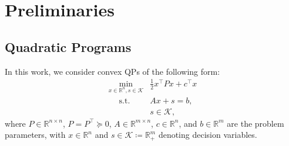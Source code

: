 \documentclass[10pt]{article} %
\begin{document}
\section{Preliminaries}
\label{sec:pre}

\subsection{Quadratic Programs}
In this work, we consider convex QPs of the following form:
\begin{equation}
\label{eq:qcp}
    \begin{array}{ll}
        \underset{x\in\mathbb{R}^n, s\in\mathcal{K}}{\min} & \frac{1}{2} x^{\top} P x + c^{\top} x \\
        \quad \; \text{s.t.} & A x + s = b, \\
                          & s \in \mathcal{K},
    \end{array}
\end{equation}
where $P\in\mathbb{R}^{n\times n}$, $P = P^\top\succeq 0$, $A \in \mathbb{R}^{m \times n}$, $c \in \mathbb{R}^n$, and $b \in \mathbb{R}^m$ are the problem parameters, with $x \in \mathbb{R}^n$ and $s \in \mathcal{K} \coloneqq  \mathbb{R}_{+}^m$ denoting decision variables. 
\end{document}
